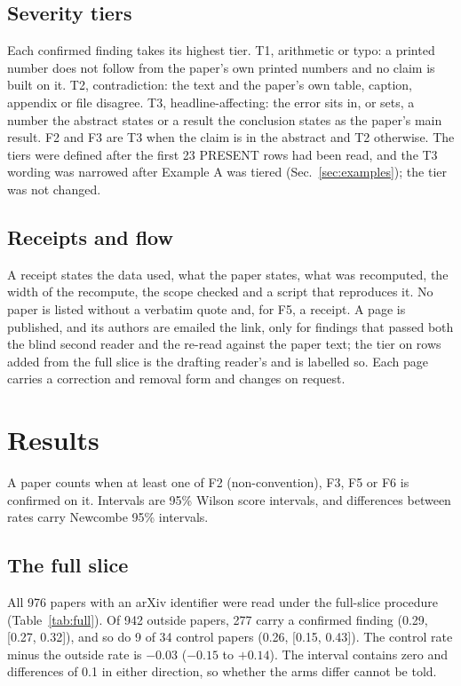 \documentclass[reprint,amsmath,amssymb,aps,superscriptaddress,nofootinbib]{revtex4-2}
\begin{document}
\subsection{Severity tiers}

Each confirmed finding takes its highest tier. T1, arithmetic or typo: a printed number does not follow from the paper's own printed numbers and no claim is built on it. T2, contradiction: the text and the paper's own table, caption, appendix or file disagree. T3, headline-affecting: the error sits in, or sets, a number the abstract states or a result the conclusion states as the paper's main result. F2 and F3 are T3 when the claim is in the abstract and T2 otherwise. The tiers were defined after the first 23 PRESENT rows had been read, and the T3 wording was narrowed after Example A was tiered (Sec.~\ref{sec:examples}); the tier was not changed.

\subsection{Receipts and flow}

A receipt states the data used, what the paper states, what was recomputed, the width of the recompute, the scope checked and a script that reproduces it. No paper is listed without a verbatim quote and, for F5, a receipt. A page is published, and its authors are emailed the link, only for findings that passed both the blind second reader and the re-read against the paper text; the tier on rows added from the full slice is the drafting reader's and is labelled so. Each page carries a correction and removal form and changes on request.

\section{Results}

A paper counts when at least one of F2 (non-convention), F3, F5 or F6 is confirmed on it. Intervals are 95\% Wilson score intervals, and differences between rates carry Newcombe 95\% intervals.

\subsection{The full slice}
\label{sec:full}

All 976 papers with an arXiv identifier were read under the full-slice procedure (Table~\ref{tab:full}). Of 942 outside papers, 277 carry a confirmed finding (0.29, [0.27, 0.32]), and so do 9 of 34 control papers (0.26, [0.15, 0.43]). The control rate minus the outside rate is $-0.03$ ($-0.15$ to $+0.14$). The interval contains zero and differences of 0.1 in either direction, so whether the arms differ cannot be told.
\end{document}
